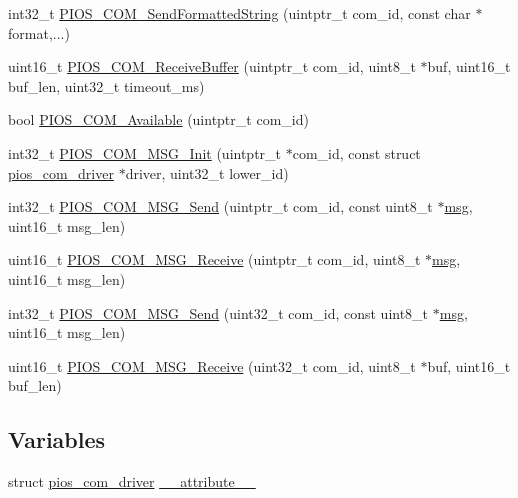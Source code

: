 \begin{DoxyCompactItemize}
\item 
int32\-\_\-t \hyperlink{group___p_i_o_s___c_o_m_ga1e351c526477c605ee404318ba3c0b79}{\-P\-I\-O\-S\-\_\-\-C\-O\-M\-\_\-\-Send\-Formatted\-String} (uintptr\-\_\-t com\-\_\-id, const char $\ast$format,...)
\item 
uint16\-\_\-t \hyperlink{group___p_i_o_s___c_o_m_ga5e15e044cb0abca89b5655a359d1ef03}{\-P\-I\-O\-S\-\_\-\-C\-O\-M\-\_\-\-Receive\-Buffer} (uintptr\-\_\-t com\-\_\-id, uint8\-\_\-t $\ast$buf, uint16\-\_\-t buf\-\_\-len, uint32\-\_\-t timeout\-\_\-ms)
\item 
bool \hyperlink{group___p_i_o_s___c_o_m_ga5af0bd94df12381d390fae8925f99a03}{\-P\-I\-O\-S\-\_\-\-C\-O\-M\-\_\-\-Available} (uintptr\-\_\-t com\-\_\-id)
\item 
int32\-\_\-t \hyperlink{group___p_i_o_s___c_o_m_ga187560edfa4a2c937b78a0655cbfe8d4}{\-P\-I\-O\-S\-\_\-\-C\-O\-M\-\_\-\-M\-S\-G\-\_\-\-Init} (uintptr\-\_\-t $\ast$com\-\_\-id, const struct \hyperlink{structpios__com__driver}{pios\-\_\-com\-\_\-driver} $\ast$driver, uint32\-\_\-t lower\-\_\-id)
\item 
int32\-\_\-t \hyperlink{group___p_i_o_s___c_o_m_ga219314be39648cc0388a74f42aa55655}{\-P\-I\-O\-S\-\_\-\-C\-O\-M\-\_\-\-M\-S\-G\-\_\-\-Send} (uintptr\-\_\-t com\-\_\-id, const uint8\-\_\-t $\ast$\hyperlink{_libraries_2rscode_2example_8c_a6248cb5c33683ab9f937d2a954646849}{msg}, uint16\-\_\-t msg\-\_\-len)
\item 
uint16\-\_\-t \hyperlink{group___p_i_o_s___c_o_m_ga3944f281a0f407a0e76b1bb3ac325e64}{\-P\-I\-O\-S\-\_\-\-C\-O\-M\-\_\-\-M\-S\-G\-\_\-\-Receive} (uintptr\-\_\-t com\-\_\-id, uint8\-\_\-t $\ast$\hyperlink{_libraries_2rscode_2example_8c_a6248cb5c33683ab9f937d2a954646849}{msg}, uint16\-\_\-t msg\-\_\-len)
\item 
int32\-\_\-t \hyperlink{group___p_i_o_s___c_o_m_ga6f9d0b6877a3c996aab0aff76a32819d}{\-P\-I\-O\-S\-\_\-\-C\-O\-M\-\_\-\-M\-S\-G\-\_\-\-Send} (uint32\-\_\-t com\-\_\-id, const uint8\-\_\-t $\ast$\hyperlink{_libraries_2rscode_2example_8c_a6248cb5c33683ab9f937d2a954646849}{msg}, uint16\-\_\-t msg\-\_\-len)
\item 
uint16\-\_\-t \hyperlink{group___p_i_o_s___c_o_m_gae5a107b30db7282de1e3cfbb2c1622e8}{\-P\-I\-O\-S\-\_\-\-C\-O\-M\-\_\-\-M\-S\-G\-\_\-\-Receive} (uint32\-\_\-t com\-\_\-id, uint8\-\_\-t $\ast$buf, uint16\-\_\-t buf\-\_\-len)
\end{DoxyCompactItemize}
\subsection*{\-Variables}
\begin{DoxyCompactItemize}
\item 
struct \hyperlink{structpios__com__driver}{pios\-\_\-com\-\_\-driver} \hyperlink{group___p_i_o_s___c_o_m_ga96488b3664325a6ced2f450ae40fb296}{\-\_\-\-\_\-attribute\-\_\-\-\_\-}
\end{DoxyCompactItemize}



